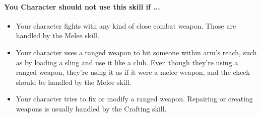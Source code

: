 \begin{multicols}{2}
\paragraph{You Character should not use this skill if ...}
\begin{itemize}
    \item Your character fights with any kind of close combat weapon. Those are
        handled by the Melee skill.
    \item Your character uses a ranged weapon to hit someone within arm's reach,
        such as by loading a sling and use it like a club. Even though they're
        using a ranged weapon, they’re using it as if it were a melee weapon, and
        the check should be handled by the Melee skill.
    \item Your character tries to fix or modify a ranged weapon. Repairing or
        creating weapons is usually handled by the Crafting skill.
\end{itemize}

\end{multicols}
